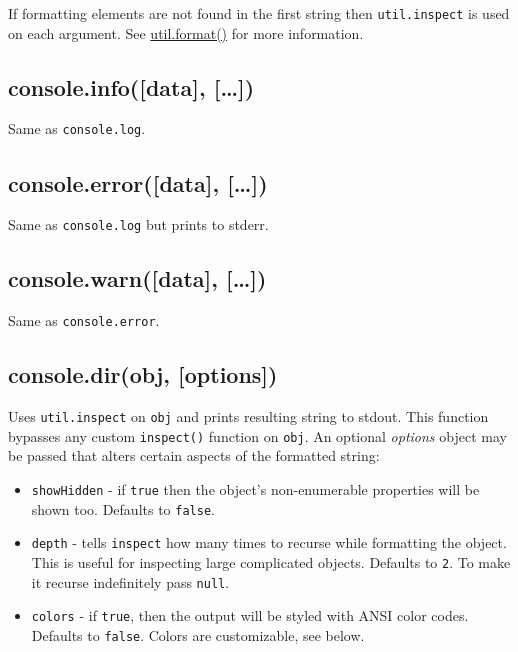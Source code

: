 If formatting elements are not found in the first string then
\texttt{util.inspect} is used on each argument. See
\href{util.html\#util_util_format_format}{util.format()} for more
information.

\subsection{console.info({[}data{]},
{[}\ldots{}{]})}\label{console.infodata}

Same as \texttt{console.log}.

\subsection{console.error({[}data{]},
{[}\ldots{}{]})}\label{console.errordata}

Same as \texttt{console.log} but prints to stderr.

\subsection{console.warn({[}data{]},
{[}\ldots{}{]})}\label{console.warndata}

Same as \texttt{console.error}.

\subsection{console.dir(obj,
{[}options{]})}\label{console.dirobj-options}

Uses \texttt{util.inspect} on \texttt{obj} and prints resulting string
to stdout. This function bypasses any custom \texttt{inspect()} function
on \texttt{obj}. An optional \emph{options} object may be passed that
alters certain aspects of the formatted string:

\begin{itemize}
\item
  \texttt{showHidden} - if \texttt{true} then the object's
  non-enumerable properties will be shown too. Defaults to
  \texttt{false}.
\item
  \texttt{depth} - tells \texttt{inspect} how many times to recurse
  while formatting the object. This is useful for inspecting large
  complicated objects. Defaults to \texttt{2}. To make it recurse
  indefinitely pass \texttt{null}.
\item
  \texttt{colors} - if \texttt{true}, then the output will be styled
  with ANSI color codes. Defaults to \texttt{false}. Colors are
  customizable, see below.
\end{itemize}

